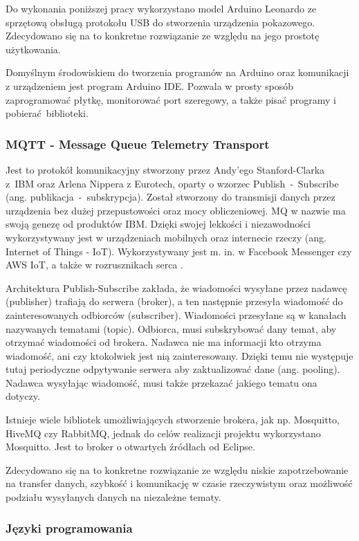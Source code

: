 \documentclass[12pt,twoside,polish]{article}
\begin{document}
Do wykonania poniższej pracy wykorzystano model Arduino Leonardo ze sprzętową obsługą protokołu USB do stworzenia urządzenia pokazowego. Zdecydowano się na to konkretne rozwiązanie ze względu na jego prostotę użytkowania.

Domyślnym środowiskiem do tworzenia programów na Arduino oraz komunikacji z urządzeniem jest program Arduino IDE. Pozwala w prosty sposób zaprogramować płytkę, monitorować port szeregowy, a także pisać programy i pobierać biblioteki.

\subsubsection[MQTT]{MQTT - Message Queue Telemetry Transport}

Jest to protokół komunikacyjny stworzony przez Andy'ego Stanford-Clarka z~IBM oraz Arlena Nippera z Eurotech, oparty o wzorzec Publish~-~Subscribe (ang. publikacja~-~subskrypcja). Został stworzony do transmisji danych przez urządzenia bez dużej przepustowości oraz mocy obliczeniowej. MQ w nazwie ma swoją genezę od produktów IBM. Dzięki swojej lekkości i niezawodności wykorzystywany jest w urządzeniach mobilnych oraz internecie rzeczy (ang. Internet of Things - IoT). Wykorzystywany jest m. in. w Facebook Messenger czy AWS IoT, a także w rozrusznikach serca \cite{mqtt}.

Architektura Publish-Subscribe zakłada, że wiadomości wysyłane przez nadawcę (publisher) trafiają do serwera (broker), a ten następnie przesyła wiadomość do zainteresowanych odbiorców (subscriber). Wiadomości przesyłane są w kanałach nazywanych tematami (topic). Odbiorca, musi subskrybować dany temat, aby otrzymać wiadomości od brokera. Nadawca nie ma informacji kto otrzyma wiadomość, ani czy ktokolwiek jest nią zainteresowany. Dzięki temu nie występuje tutaj periodyczne odpytywanie serwera aby zaktualizować dane (ang. pooling). Nadawca wysyłając wiadomość, musi także przekazać jakiego tematu ona dotyczy.

Istnieje wiele bibliotek umożliwiających stworzenie brokera, jak np. Mosquitto, HiveMQ czy RabbitMQ, jednak do celów realizacji projektu wykorzystano Mosquitto. Jest to broker o otwartych źródłach od Eclipse.

Zdecydowano się na to konkretne rozwiązanie ze względu niskie zapotrzebowanie na transfer danych, szybkość i komunikację w czasie rzeczywistym oraz możliwość podziału wysyłanych danych na niezależne tematy.

\subsubsection{Języki programowania}
\end{document}

